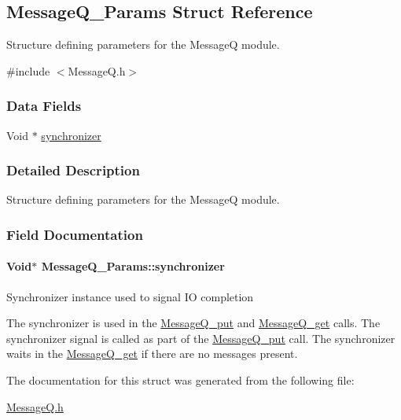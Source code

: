 \subsection{MessageQ\_\-Params Struct Reference}
\label{struct_message_q___params}


Structure defining parameters for the MessageQ module.  




{\ttfamily \#include $<$MessageQ.h$>$}

\subsubsection*{Data Fields}
\begin{DoxyCompactItemize}
\item 
Void $\ast$ \hyperlink{struct_message_q___params_a6f428033e1aa39162fd51a6d8ade1c9d}{synchronizer}
\end{DoxyCompactItemize}


\subsubsection{Detailed Description}
Structure defining parameters for the MessageQ module. 

\subsubsection{Field Documentation}
\paragraph[{synchronizer}]{\setlength{\rightskip}{0pt plus 5cm}Void$\ast$ {\bf MessageQ\_\-Params::synchronizer}}\hfill\label{struct_message_q___params_a6f428033e1aa39162fd51a6d8ade1c9d}
Synchronizer instance used to signal IO completion

The synchronizer is used in the \hyperlink{_message_q_8h_aa628f9bf897924f61d6adfba3f82fa8d}{MessageQ\_\-put} and \hyperlink{_message_q_8h_aaeb270f6b50d96f1e1dd134591ffc380}{MessageQ\_\-get} calls. The synchronizer signal is called as part of the \hyperlink{_message_q_8h_aa628f9bf897924f61d6adfba3f82fa8d}{MessageQ\_\-put} call. The synchronizer waits in the \hyperlink{_message_q_8h_aaeb270f6b50d96f1e1dd134591ffc380}{MessageQ\_\-get} if there are no messages present. 

The documentation for this struct was generated from the following file:\begin{DoxyCompactItemize}
\item 
\hyperlink{_message_q_8h}{MessageQ.h}\end{DoxyCompactItemize}
